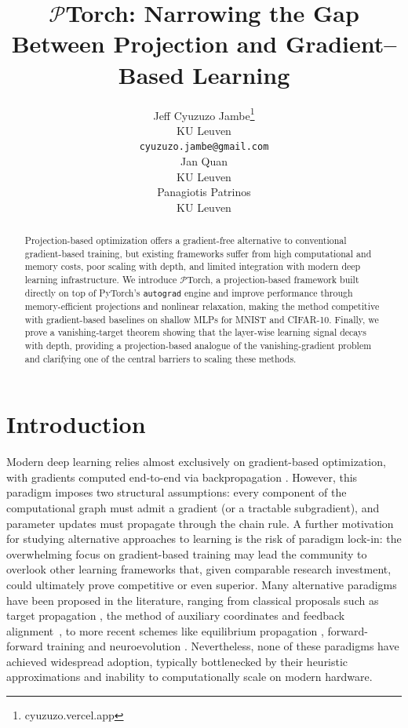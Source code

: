 \documentclass{article}
\title{$\mathcal{P}$Torch: Narrowing the Gap Between Projection and Gradient--Based Learning}
\author{%
  Jeff Cyuzuzo Jambe\thanks{cyuzuzo.vercel.app} \\
  KU Leuven\\
  \texttt{cyuzuzo.jambe@gmail.com} \\
  \And
  Jan Quan \\
  KU Leuven\\
  \And
  Panagiotis Patrinos \\
  KU Leuven\\

}
\begin{document}
\maketitle

\begin{abstract}
Projection-based optimization offers a gradient-free alternative to conventional gradient-based training, but existing frameworks suffer from high computational and memory costs, poor scaling with depth, and limited integration with modern deep learning infrastructure. We introduce $\mathcal{P}$Torch, a projection-based framework built directly on top of PyTorch's \texttt{autograd} engine and improve performance through memory-efficient projections and nonlinear relaxation, making the method competitive with gradient-based baselines on shallow MLPs for MNIST and CIFAR-10. Finally, we prove a vanishing-target theorem showing that the layer-wise learning signal decays with depth, providing a projection-based analogue of the vanishing-gradient problem and clarifying one of the central barriers to scaling these methods.
\end{abstract}

\section{Introduction}
Modern deep learning relies almost exclusively on gradient-based optimization, with gradients computed end-to-end via backpropagation \cite{rumelhart1986learning}. However, this paradigm imposes two structural assumptions: every component of the computational graph must admit a gradient (or a tractable subgradient), and parameter updates must propagate through the chain rule. A further motivation for studying alternative approaches to learning is the risk of paradigm lock-in: the overwhelming focus on gradient-based training may lead the community to overlook other learning frameworks that, given comparable research investment, could ultimately prove competitive or even superior. Many alternative paradigms have been proposed in the literature, ranging from classical proposals such as target propagation \cite{lee2015difference}, the method of auxiliary coordinates \cite{carreira2014distributed} and feedback alignment~\cite{lillicrap2016random}, to more recent schemes like equilibrium propagation \cite{scellier2017equilibrium}, forward-forward training \cite{hinton2022forward} and neuroevolution \cite{such2017deep}. Nevertheless, none of these paradigms have achieved widespread adoption, typically bottlenecked by their heuristic approximations and inability to computationally scale on modern hardware.
\end{document}
